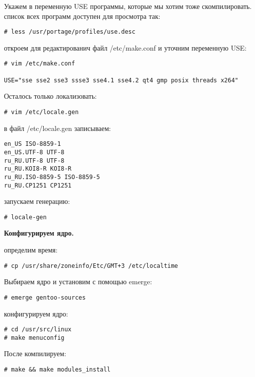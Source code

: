 \documentclass[12pt, a4paper]{article}
\begin{document}
Укажем в переменную USE программы, которые мы хотим тоже скомпилировать. список всех программ доступен для просмотра так:

\begin{verbatim}
# less /usr/portage/profiles/use.desc
\end{verbatim}

откроем для редактированич файл /etc/make.conf и уточним переменную USE:

\begin{verbatim}
# vim /etc/make.conf

USE="sse sse2 sse3 ssse3 sse4.1 sse4.2 qt4 gmp posix threads x264"
\end{verbatim}

Осталось только локализовать:

\begin{verbatim}
# vim /etc/locale.gen
\end{verbatim}

в файл /etc/locale.gen записываем:

\begin{verbatim}
en_US ISO-8859-1
en_US.UTF-8 UTF-8
ru_RU.UTF-8 UTF-8
ru_RU.KOI8-R KOI8-R
ru_RU.ISO-8859-5 ISO-8859-5
ru_RU.CP1251 CP1251
\end{verbatim}

запускаем генерацию:

\begin{verbatim}
# locale-gen
\end{verbatim}

{\bf Конфигурируем ядро.}

определим время:

\begin{verbatim}
# cp /usr/share/zoneinfo/Etc/GMT+3 /etc/localtime
\end{verbatim}

Выбираем ядро и установим с помощью emerge:

\begin{verbatim}
# emerge gentoo-sources
\end{verbatim}

конфигурируем ядро:

\begin{verbatim}
# cd /usr/src/linux
# make menuconfig
\end{verbatim}

После компилируем:

\begin{verbatim}
# make && make modules_install
\end{verbatim}
\end{document}

